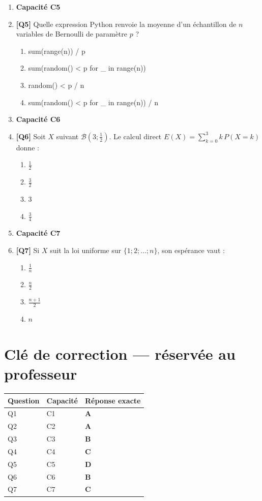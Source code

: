 \begin{enumerate}
\item[] \textbf{Capacité C5}

\item \textbf{[Q5]} Quelle expression Python renvoie la moyenne d'un échantillon de $n$ variables de Bernoulli de paramètre $p$ ?
  \begin{enumerate}[label=\Alph*.]
    \item sum(range(n)) / p
    \item sum(random() < p for \_ in range(n))
    \item random() < p / n
    \item sum(random() < p for \_ in range(n)) / n
  \end{enumerate}

\item[] \textbf{Capacité C6}

\item \textbf{[Q6]} Soit $X$ suivant $\mathcal B(3;\tfrac12)$. Le calcul direct $E(X)=\sum_{k=0}^{3} k\,P(X=k)$ donne :
  \begin{enumerate}[label=\Alph*.]
    \item $\tfrac12$
    \item $\tfrac32$
    \item $3$
    \item $\tfrac34$
  \end{enumerate}

\item[] \textbf{Capacité C7}

\item \textbf{[Q7]} Si $X$ suit la loi uniforme sur $\{1;2;\dots;n\}$, son espérance vaut :
  \begin{enumerate}[label=\Alph*.]
    \item $\tfrac1n$
    \item $\tfrac n2$
    \item $\tfrac{n+1}2$
    \item $n$
  \end{enumerate}

\end{enumerate}

\ifnxVersionProfesseur
\clearpage
\section*{Clé de correction — réservée au professeur}

\begin{center}
\begin{tabular}{lll}
\hline
Question & Capacité & Réponse exacte \\
\hline
Q1 & C1 & \textbf{A} \\
Q2 & C2 & \textbf{A} \\
Q3 & C3 & \textbf{B} \\
Q4 & C4 & \textbf{C} \\
Q5 & C5 & \textbf{D} \\
Q6 & C6 & \textbf{B} \\
Q7 & C7 & \textbf{C} \\
\hline
\end{tabular}
\end{center}

